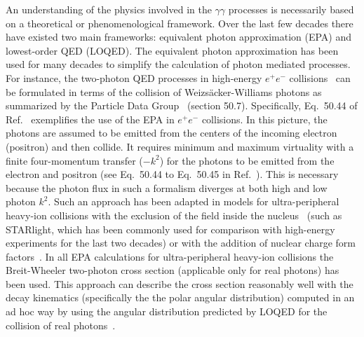 \documentclass[12pt,epjc3]{svjour3}\sloppy
\begin{document}
An understanding of the physics involved in the $\gamma\gamma$ processes is necessarily based on a theoretical or phenomenological framework. Over the last few decades there have existed two main frameworks: equivalent photon approximation (EPA) and lowest-order QED (LOQED). 
The equivalent photon approximation has been used for many decades to simplify the calculation of photon mediated processes.
For instance, the two-photon QED processes in high-energy $e^+e^-$ collisions~\cite{brodskyTwoPhotonMechanismParticle1971a,budnev_two-photon_1975} can be formulated in terms of the collision of Weizsäcker-Williams photons as summarized by the Particle Data Group~\cite{zyla_review_2020} (section 50.7).
Specifically, Eq.~50.44 of Ref.~\cite{zyla_review_2020} exemplifies the use of the EPA in $e^+e^-$ collisions.  
In this picture, the photons are assumed to be emitted from the centers of the incoming electron (positron) and then collide. 
It requires minimum and maximum virtuality with a finite four-momentum transfer ($-k^2$) for the photons to be emitted from the electron and positron (see Eq.~50.44 to Eq.~50.45 in Ref.~\cite{zyla_review_2020}). 
This is necessary because the photon flux in such a formalism diverges at both high and low photon $k^2$. 
Such an approach has been adapted in models for ultra-peripheral heavy-ion collisions with the exclusion of the field inside the nucleus~\cite{kleinSTARlightMonteCarlo2017b,kleinExclusiveVectorMeson1999a} (such as STARlight, which has been commonly used for comparison with high-energy experiments for the last two decades) or with the addition of nuclear charge form factors~\cite{klein_two-photon_2018}.
In all EPA calculations for ultra-peripheral heavy-ion collisions the Breit-Wheeler two-photon cross section (applicable only for real photons) has been used. 
This approach can describe the cross section reasonably well with the decay kinematics (specifically the the polar angular distribution) computed in an ad hoc way by using the angular distribution predicted by LOQED for the collision of real photons~\cite{brodskyTwoPhotonMechanismParticle1971a,kleinSTARlightMonteCarlo2017b}. 
\end{document}
